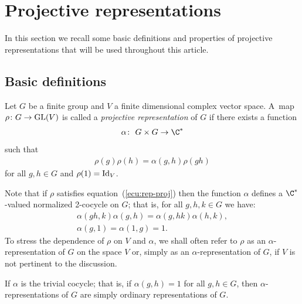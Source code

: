 \section{Projective representations}\label{Section 2}

In this section we recall some basic definitions and properties of projective representations that
will be used throughout this article.

\subsection{Basic definitions}

\begin{Def}
Let $G$ be a finite group and $V$ a finite dimensional complex
vector space. A~map $\rho\colon G\rightarrow {\rm GL}(V)$ is called a
\textit{projective representation} of $G$ if there exists a
function
\begin{gather*}
\alpha\colon \ G\times G \rightarrow \C^{\ast}
\end{gather*}
such that
\begin{gather}
\rho(g)\rho(h)=\alpha(g,h)\rho(gh)\label{ecu:rep-proj}
\end{gather}
for all $g,h\in G$ and $\rho(1)={\rm Id}_{V}$.
\end{Def}
	
Note that if $\rho$ satisfies equation~(\ref{ecu:rep-proj}) then the function $\alpha$ defines a
$\C^{\ast}$-valued normalized 2-cocycle on $G$; that is, for all $g,h,k\in G$ we have:
\begin{gather*}
\alpha(gh,k)\alpha(g,h)=\alpha(g,hk)\alpha(h,k),
\\
\alpha(g,1)=\alpha(1,g)=1.
\end{gather*}
To stress the dependence of $\rho$ on $V$ and $\alpha$, we shall
often refer to $\rho$ as an $\alpha$-representation of $G$
on the space $V$ or, simply as an $\alpha$-representation of
$G$, if $V$ is not pertinent to the discussion.

\begin{Rem}
If $\alpha$ is the trivial cocycle; that is, if $\alpha(g,h)=1$ for all $g,h\in G$, then
$\alpha$-representations of $G$ are simply ordinary representations of $G$.
\end{Rem}


